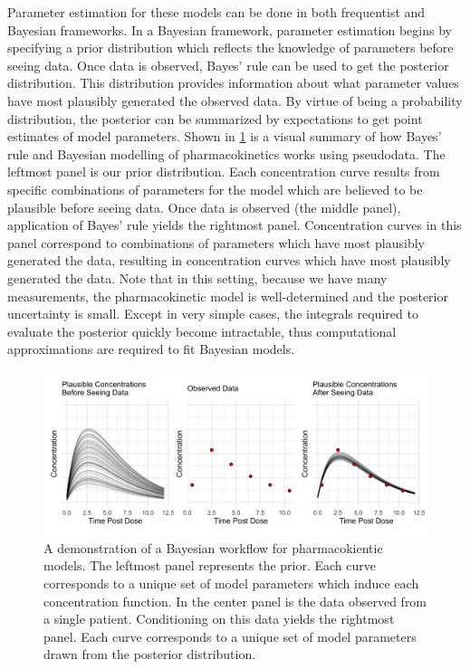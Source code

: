 Parameter estimation for these models can be done in both frequentist and Bayesian frameworks.  In a Bayesian framework, parameter estimation begins by specifying a prior distribution which reflects the knowledge of parameters before seeing data. Once data is observed, Bayes’ rule can be used to get the posterior distribution.  This distribution provides information about what parameter values have most plausibly generated the observed data.  By virtue of being a probability distribution, the posterior can be summarized by expectations to get point estimates of model parameters. Shown in \cref{fig:fig1} is a visual summary of how Bayes’ rule and Bayesian modelling of pharmacokinetics works using pseudodata. The leftmost panel is our prior distribution.  Each concentration curve results from specific combinations of parameters for the model which are believed to be plausible before seeing data.  Once data is observed (the middle panel), application of Bayes’ rule yields the rightmost panel.  Concentration curves in this panel correspond to combinations of parameters which have most plausibly generated the data, resulting in concentration curves which have most plausibly generated the data. Note that in this setting, because we have many measurements, the pharmacokinetic model is well-determined and the posterior uncertainty is small. Except in very simple cases, the integrals required to evaluate the posterior quickly become intractable, thus computational approximations are required to fit Bayesian models.
%
\begin{figure} [h!]
	\centering
	\includegraphics[width=\linewidth]{figs/fig_1}
	\caption{A demonstration of a Bayesian workflow for pharmacokientic models.  The leftmost panel represents the prior.  Each curve corresponds to a unique set of model parameters which induce each concentration function.  In the center panel is the data observed from a single patient.  Conditioning on this data yields the rightmost panel.  Each curve corresponds to a unique set of model parameters drawn from the posterior distribution.} 
	\label{fig:fig1}
\end{figure}
%
